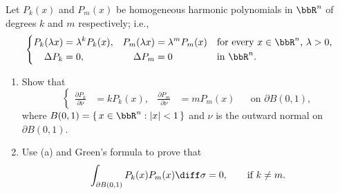 \begin{problem}
  Let \(P_k(x)\) and \(P_m(x)\) be homogeneous harmonic polynomials in
  \(\bbR^n\) of degrees \(k\) and \(m\) respectively; i.e.,
  \[
    \left\{%
      \begin{aligned}
        P_k(\lambda x)&=\lambda^k P_k(x),&P_m(\lambda x)&=\lambda^m P_m(x)
        &&\text{for every \(x\in\bbR^n\), \(\lambda>0\),}\\
        \Delta P_k&=0,&\Delta P_m&=0&&\text{in \(\bbR^n\).}
      \end{aligned}
    \right.
  \]
  \begin{enumerate}[label=(\alph*),noitemsep]
  \item Show that
    \[
      \left\{%
        \begin{aligned}
          \frac{\partial P_k}{\partial \nu}&=kP_k(x),& \frac{\partial
            P_m}{\partial\nu}&=mP_m(x)&&\text{on \(\partial B(0,1)\),}
        \end{aligned}
      \right.
    \]
    where \(B(0,1)=\{\,x\in\bbR^n:|x|<1\,\}\) and \(\nu\) is the outward
    normal on \(\partial B(0,1)\).
  \item Use (a) and Green's formula to prove that
    \[
      \int_{\partial B(0,1)}P_k(x)P_m(x)\diff\sigma=0,\qquad\text{if
        \(k\neq m\).}
    \]
  \end{enumerate}
\end{problem}
\begin{solution}
\end{solution}

